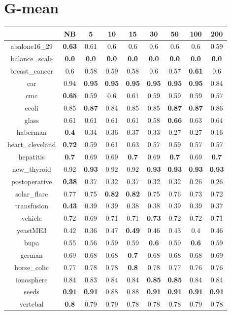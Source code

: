 \documentclass{article}%
\begin{document}
%
\section*{G{-}mean}%
\begin{tabular}{c|cccccccc}%
\hline%
&NB&5&10&15&30&50&100&200\\%
\hline%
abalone16\_29&\textbf{0.63}&0.61&0.6&0.6&0.6&0.6&0.6&0.59\\%
\hline%
balance\_scale&\textbf{0.0}&\textbf{0.0}&\textbf{0.0}&\textbf{0.0}&\textbf{0.0}&\textbf{0.0}&\textbf{0.0}&\textbf{0.0}\\%
\hline%
breast\_cancer&0.6&0.58&0.59&0.58&0.6&0.57&\textbf{0.61}&0.6\\%
\hline%
car&0.94&\textbf{0.95}&\textbf{0.95}&\textbf{0.95}&\textbf{0.95}&\textbf{0.95}&\textbf{0.95}&0.84\\%
\hline%
cmc&\textbf{0.65}&0.59&0.6&0.61&0.59&0.59&0.59&0.57\\%
\hline%
ecoli&0.85&\textbf{0.87}&0.84&0.85&0.85&\textbf{0.87}&\textbf{0.87}&0.86\\%
\hline%
glass&0.61&0.61&0.61&0.61&0.58&\textbf{0.66}&0.63&0.64\\%
\hline%
haberman&\textbf{0.4}&0.34&0.36&0.37&0.33&0.27&0.27&0.16\\%
\hline%
heart\_cleveland&\textbf{0.72}&0.59&0.61&0.63&0.57&0.59&0.57&0.57\\%
\hline%
hepatitis&\textbf{0.7}&0.69&0.69&\textbf{0.7}&0.69&\textbf{0.7}&0.69&\textbf{0.7}\\%
\hline%
new\_thyroid&0.92&\textbf{0.93}&0.92&0.92&\textbf{0.93}&\textbf{0.93}&\textbf{0.93}&\textbf{0.93}\\%
\hline%
postoperative&\textbf{0.38}&0.37&0.32&0.37&0.32&0.32&0.26&0.26\\%
\hline%
solar\_flare&0.77&0.75&\textbf{0.82}&\textbf{0.82}&0.75&0.76&0.73&0.72\\%
\hline%
transfusion&\textbf{0.43}&0.39&0.39&0.38&0.38&0.39&0.39&0.37\\%
\hline%
vehicle&0.72&0.69&0.71&0.71&\textbf{0.73}&0.72&0.72&0.71\\%
\hline%
yeastME3&0.42&0.36&0.47&\textbf{0.49}&0.46&0.43&0.4&0.46\\%
\hline%
bupa&0.55&0.56&0.59&0.59&\textbf{0.6}&0.59&\textbf{0.6}&0.59\\%
\hline%
german&0.69&0.68&0.68&\textbf{0.7}&0.68&0.68&0.68&0.69\\%
\hline%
horse\_colic&0.77&0.78&0.78&\textbf{0.8}&0.78&0.77&0.76&0.76\\%
\hline%
ionosphere&0.84&0.83&0.84&0.84&\textbf{0.85}&\textbf{0.85}&0.84&0.84\\%
\hline%
seeds&\textbf{0.91}&\textbf{0.91}&0.88&0.88&\textbf{0.91}&\textbf{0.91}&\textbf{0.91}&\textbf{0.91}\\%
\hline%
vertebal&\textbf{0.8}&0.79&0.79&0.78&0.78&0.78&0.79&0.78\\%
\hline%
\end{tabular}

%
\end{document}
